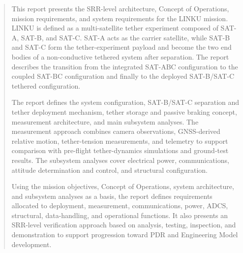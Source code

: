 \documentclass[a4paper, twoside]{report}
\begin{document}


\begin{abstract}
This report presents the SRR-level architecture, Concept of Operations, mission requirements, and system requirements for the LINKU mission. LINKU is defined as a multi-satellite tether experiment composed of SAT-A, SAT-B, and SAT-C. SAT-A acts as the carrier satellite, while SAT-B and SAT-C form the tether-experiment payload and become the two end bodies of a non-conductive tethered system after separation. The report describes the transition from the integrated SAT-ABC configuration to the coupled SAT-BC configuration and finally to the deployed SAT-B/SAT-C tethered configuration.

The report defines the system configuration, SAT-B/SAT-C separation and tether deployment mechanism, tether storage and passive braking concept, measurement architecture, and main subsystem analyses. The measurement approach combines camera observations, GNSS-derived relative motion, tether-tension measurements, and telemetry to support comparison with pre-flight tether-dynamics simulations and ground-test results. The subsystem analyses cover electrical power, communications, attitude determination and control, and structural configuration.

Using the mission objectives, Concept of Operations, system architecture, and subsystem analyses as a basis, the report defines requirements allocated to deployment, measurement, communications, power, ADCS, structural, data-handling, and operational functions. It also presents an SRR-level verification approach based on analysis, testing, inspection, and demonstration to support progression toward PDR and Engineering Model development.
\end{abstract}

\tableofcontents
\listoffigures
\listoftables



%









%


\end{document}
